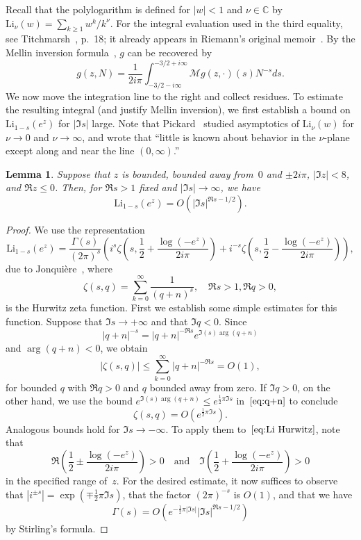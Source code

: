 \documentclass[a4paper]{amsart}
\newtheorem{lemma}[theorem]{Lemma}
\begin{document}
Recall that the polylogarithm is
defined for $|w|<1$  and $\nu\in\mathbb{C}$ by $\mathrm{Li}_\nu(w) = \sum_{k\geq1}w^k/k^\nu$.
For the integral evaluation used in the third equality,
see Titchmarsh~\cite{Ti86}, p.~18; it already appears in Riemann's
original memoir~\cite{Ri59}.
By the Mellin inversion formula~\cite{FlGoDu95},  $g$ can be recovered by
\begin{equation}\label{eq:g mell}
  g(z,N) = \frac{1}{2i\pi} \int_{-3/2-i\infty}^{-3/2+i \infty} \mathcal{M}g(z,\cdot)(s) N^{-s}ds.
\end{equation}
We now move the integration line to the right and collect residues.
To estimate the resulting integral (and justify Mellin inversion),
we first establish a bound on
$ \mathrm{Li}_{1-s}(e^z)$ for $|\Im s|$ large. Note that Pickard~\cite{Pi68}
studied asymptotics of $\mathrm{Li}_\nu(w)$ for $\nu\to0$ and $\nu\to\infty$,
and wrote that ``little is known about behavior in the $\nu$-plane
except along and near the line $(0,\infty)$.''
%
\begin{lemma}\label{le:Li}
  Suppose that $z$ is bounded, bounded away from~$0$ and $\pm 2i\pi$,
  $|\Im z|<8$, and $\Re z \leq 0$. Then,
  for $\Re s>1$ fixed and $|\Im s|\to\infty$, we have
  \[
     \mathrm{Li}_{1-s}(e^z) = O( |\Im s|^{\Re s -1/2}).
  \]
\end{lemma}
\begin{proof}
  We use the representation
  \begin{equation}\label{eq:Li Hurwitz}
    \mathrm{Li}_{1-s}(e^z) = \frac{\Gamma(s)}{(2\pi)^s}
      \left( i^s \zeta\left(s,\frac12 + \frac{\log(-e^z)}{2i\pi}\right)
      + i^{-s} \zeta\left(s,\frac12 - \frac{\log(-e^z)}{2i\pi}\right)\right),
  \end{equation}
  due to Jonqui{\`e}re~\cite{Jo89}, where
  \[
    \zeta(s,q) = \sum_{k=0}^\infty \frac{1}{(q+n)^s}, \quad \Re s >1, \Re q >0,
  \]
  is the Hurwitz zeta function. 
  First we establish some simple estimates for this function.
  Suppose that $\Im s \to +\infty$ and that $\Im q <0$. Since
  \begin{equation}\label{eq:q+n}
    |q+n|^{-s} = |q+n|^{-\Re s} e^{\Im(s) \arg(q+n)}
  \end{equation}
  and $\arg(q+n)<0$, we obtain
  \[
     |\zeta(s,q)| \leq \sum_{k=0}^\infty |q+n|^{-\Re s} = O(1),
  \]
  for bounded $q$ with $\Re q>0$ and $q$ bounded away from zero.
  If $\Im q >0$, on the other hand, we use the bound $e^{\Im(s) \arg(q+n)}
  \leq e^{\tfrac12 \pi \Im s}$ in~$\eqref{eq:q+n}$ to conclude
  \[
     \zeta(s,q) = O(e^{\tfrac12 \pi \Im s}).
  \]
  Analogous bounds hold for $\Im s\to-\infty$. To apply them to~$\eqref{eq:Li Hurwitz}$,
  note that
  \[
    \Re\left(\frac12 \pm \frac{\log(-e^z)}{2i\pi}\right)>0 \quad \text{and} \quad
    \Im\left(\frac12 + \frac{\log(-e^z)}{2i\pi}\right)>0
  \]
  in the specified range of~$z$.
  For the desired estimate, it now suffices to observe that
   $|i^{\pm s}|=\exp(\mp \tfrac12\pi
    \Im s)$, that the factor $(2\pi)^{-s}$ is $O(1)$, and that we have
  \[
    \Gamma(s) = O(e^{-\tfrac12 \pi |\Im s|} |\Im s|^{\Re s - 1/2})
  \]
  by Stirling's formula.
\end{proof}
\end{document}
